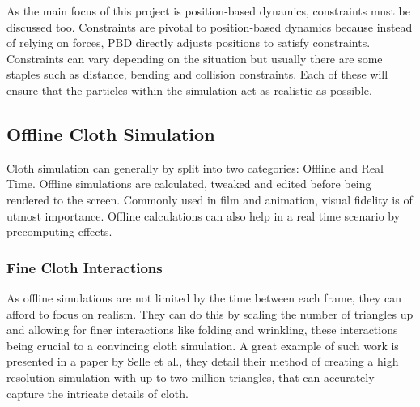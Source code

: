 \documentclass[12pt,a4paper]{article}
\begin{document}
As the main focus of this project is position-based dynamics, constraints must be discussed too. Constraints are pivotal to position-based dynamics because instead of relying on forces, PBD directly adjusts positions to satisfy constraints. Constraints can vary depending on the situation but usually there are some staples such as distance, bending and collision constraints. Each of these will ensure that the particles within the simulation act as realistic as possible. 


\subsection{Offline Cloth Simulation} 
Cloth simulation can generally by split into two categories: Offline and Real Time. Offline simulations are calculated, tweaked and edited before being rendered to the screen. Commonly used in film and animation, visual fidelity is of utmost importance. Offline calculations can also help in a real time scenario by precomputing effects. \\

\subsubsection{Fine Cloth Interactions}
As offline simulations are not limited by the time between each frame, they can afford to focus on realism. They can do this by scaling the number of triangles up and allowing for finer interactions like folding and wrinkling, these interactions being crucial to a convincing cloth simulation. A great example of such work is presented in a paper by Selle et al., they detail their method of creating a high resolution simulation with up to two million triangles, that can accurately capture the intricate details of cloth. \cite{4522545}\\
\end{document}

